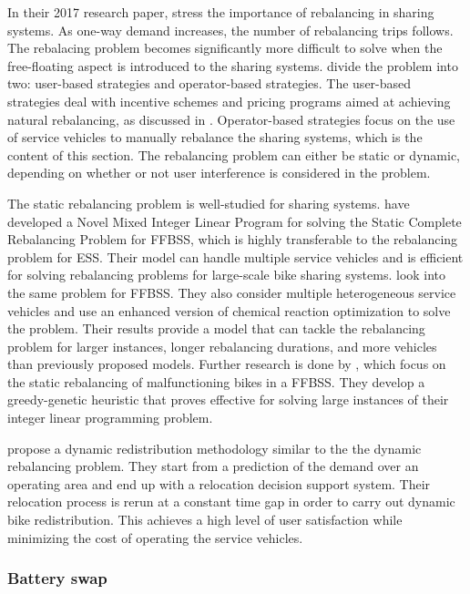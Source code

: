 In their 2017 research paper, \citet{lu_optimizing_2017} stress the importance of rebalancing in sharing systems. As one-way demand increases, the number of rebalancing trips follows. The rebalacing problem becomes significantly more difficult to solve when the free-floating aspect is introduced to the sharing systems. \citet{pal_free-floating_2017} divide the problem into two: user-based strategies and operator-based strategies. The user-based strategies deal with incentive schemes and pricing programs aimed at achieving natural rebalancing, as discussed in . Operator-based strategies focus on the use of service vehicles to manually rebalance the sharing systems, which is the content of this section. The rebalancing problem can either be static or dynamic, depending on whether or not user interference is considered in the problem.  

The static rebalancing problem is well-studied for sharing systems. \citet{pal_free-floating_2017} have developed a Novel Mixed Integer Linear Program for solving the Static Complete Rebalancing Problem for FFBSS, which is highly transferable to the rebalancing problem for ESS. Their model can handle multiple service vehicles and is efficient for solving rebalancing problems for large-scale bike sharing systems. \citet{liu_static_2018} look into the same problem for FFBSS. They also consider multiple heterogeneous service vehicles and use an enhanced version of chemical reaction optimization to solve the problem. Their results provide a model that can tackle the rebalancing problem for larger instances, longer rebalancing durations, and more vehicles than previously proposed models. Further research is done by \citet{du_static_2020}, which focus on the static rebalancing of malfunctioning bikes in a FFBSS. They develop a greedy-genetic heuristic that proves effective for solving large instances of their integer linear programming problem. 

 \citet{caggiani_modeling_2018} propose a dynamic redistribution methodology similar to the the dynamic rebalancing problem. They start from a prediction of the demand over an operating area and end up with a relocation decision support system. Their relocation process is rerun at a constant time gap in order to carry out dynamic bike redistribution. This achieves a high level of user satisfaction while minimizing the cost of operating the service vehicles. 

\subsubsection{Battery swap}

